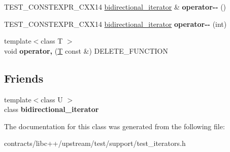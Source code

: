 \begin{DoxyCompactItemize}
\item 
\mbox{\label{classbidirectional__iterator_ac9ee7bb42e59a66a304b74f362a22093}} 
T\+E\+S\+T\+\_\+\+C\+O\+N\+S\+T\+E\+X\+P\+R\+\_\+\+C\+X\+X14 \mbox{\hyperlink{classbidirectional__iterator}{bidirectional\+\_\+iterator}} \& {\bfseries operator-\/-\/} ()
\item 
\mbox{\label{classbidirectional__iterator_ad4a0983d6be81aac6e3c8635214d3832}} 
T\+E\+S\+T\+\_\+\+C\+O\+N\+S\+T\+E\+X\+P\+R\+\_\+\+C\+X\+X14 \mbox{\hyperlink{classbidirectional__iterator}{bidirectional\+\_\+iterator}} {\bfseries operator-\/-\/} (int)
\item 
\mbox{\label{classbidirectional__iterator_a13af21fc82ef1eef992f215119cca64a}} 
{\footnotesize template$<$class T $>$ }\\void {\bfseries operator,} (\mbox{\hyperlink{struct_t}{T}} const \&) D\+E\+L\+E\+T\+E\+\_\+\+F\+U\+N\+C\+T\+I\+ON
\end{DoxyCompactItemize}
\subsection*{Friends}
\begin{DoxyCompactItemize}
\item 
\mbox{\label{classbidirectional__iterator_a56d1a5002f39317f2f908421e33c3f87}} 
{\footnotesize template$<$class U $>$ }\\class {\bfseries bidirectional\+\_\+iterator}
\end{DoxyCompactItemize}


The documentation for this class was generated from the following file\+:\begin{DoxyCompactItemize}
\item 
contracts/libc++/upstream/test/support/test\+\_\+iterators.\+h\end{DoxyCompactItemize}
